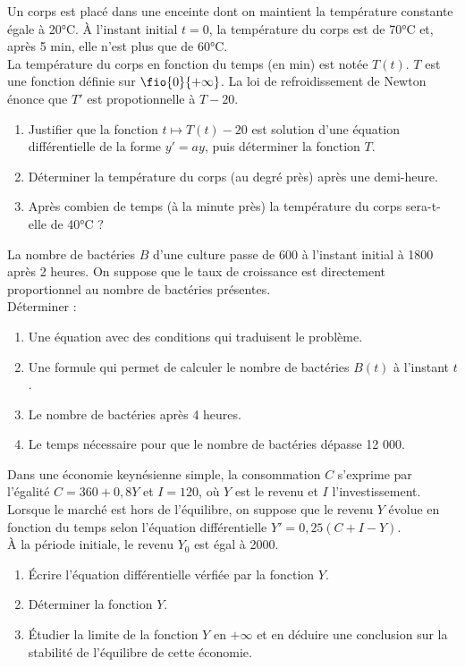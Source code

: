 \documentclass[a4paper,11pt,exos]{nsi} %
\begin{document}
Un corps est placé dans une enceinte dont on maintient la température constante égale à 20°C. À l'instant initial $t=0$, la température du corps est de 70°C et, après 5 min, elle n'est plus que de 60°C.\\
La température du corps en fonction du temps (en min) est notée $T(t)$. $T$ est une fonction définie sur $\fio{0}{+\infty}$. La loi de refroidissement de Newton énonce que $T'$ est propotionnelle à $T-20$.
\begin{enumerate}
    \item Justifier que la fonction $t\mapsto T(t)-20$ est solution d'une équation différentielle de la forme $y'=ay$, puis déterminer la fonction $T$.
    \item Déterminer la température du corps (au degré près) après une demi-heure.
    \item Après combien de temps (à la minute près) la température du corps sera-t-elle de 40°C ?
\end{enumerate}

\newpage
{}
La nombre de bactéries $B$ d'une culture passe de 600 à l'instant initial à 1800 après 2 heures. On suppose que le taux de croissance est directement proportionnel au nombre de bactéries présentes.\\[.5em]
Déterminer :
\begin{enumerate}
        \item Une équation avec des conditions qui traduisent le problème.
        \item Une formule qui permet de calculer le nombre de bactéries $B(t)$ à l'instant $t$.
        \item Le nombre de bactéries après 4 heures.
        \item Le temps nécessaire pour que le nombre de bactéries dépasse 12 000.
\end{enumerate}

Dans une économie keynésienne simple, la consommation $C$ s'exprime par l'égalité $C=360+0,8Y$ et $I=120$, où $Y$ est le revenu et $I$ l'investissement.\\
Lorsque le marché est hors de l'équilibre, on suppose que le revenu $Y$ évolue en fonction du temps selon l'équation différentielle $Y'=0,25(C+I-Y)$.\\
À la période initiale, le revenu $Y_0$ est égal à 2000.
\begin{enumerate}
    \item Écrire l'équation différentielle vérfiée par la fonction $Y$.
    \item Déterminer la fonction $Y$.
    \item Étudier la limite de la fonction $Y$ en $+\infty$ et en déduire une conclusion sur la stabilité de l'équilibre de cette économie.
\end{enumerate}
\end{document}
